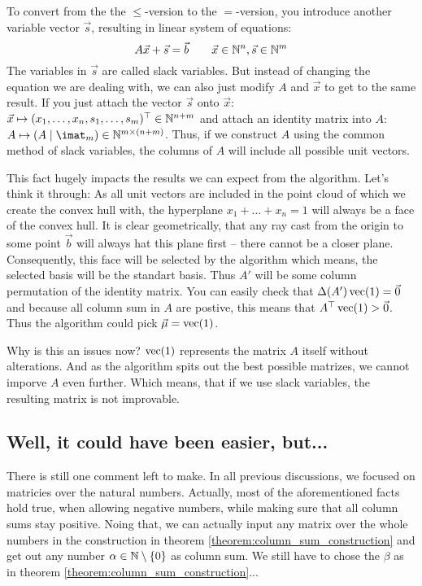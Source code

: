 To convert from the the $\leq$-version to the $=$-version, you introduce another variable vector $\vec s$, resulting in linear system of equations:
$$A\vec x + \vec s = \vec b \qquad \vec x \in \mathbb{N}^n, \vec s \in\mathbb{N}^m$$
The variables in $\vec s$ are called slack variables. But instead of changing the equation we are dealing with, we can also just modify $A$ and $\vec x$ to get to the same result. If you just attach the vector $\vec s$ onto $\vec x$: $\vec x \mapsto (x_1, \dots, x_n, s_1, \dots, s_m)^\top \in \mathbb{N}^{n+m}$ and attach an identity matrix into $A$: $A \mapsto (A \mid\imat_m) \in \N^{m \times (n + m)}$. Thus, if we construct $A$ using the common method of slack variables, the columns of $A$ will include all possible unit vectors.

This fact hugely impacts the results we can expect from the algorithm. Let's think it through: As all unit vectors are included in the point cloud of which we create the convex hull with, the hyperplane $x_1 + \dots + x_n = 1$ will always be a face of the convex hull. It is clear geometrically, that any ray cast from the origin to some point $\vec b$ will always hat this plane first – there cannot be a closer plane. Consequently, this face will be selected by the algorithm which means, the selected basis will be the standart basis.
Thus $A'$ will be some column permutation of the identity matrix. You can easily check that $\Delta(A')\operatorname{vec}(1) = \vec 0$ and because all column sum in $A$ are postive, this means that $A^\top \operatorname{vec}(1) > \vec 0$. Thus the algorithm could pick $\vec\mu = \operatorname{vec}(1)$.

Why is this an issues now? $\operatorname{vec}(1)$ represents the matrix $A$ itself without alterations. And as the algorithm spits out the best possible matrizes, we cannot imporve $A$ even further. Which means, that if we use slack variables, the resulting matrix is not improvable.

\subsection{Well, it could have been easier, but...}
There is still one comment left to make. In all previous discussions, we focused on matricies over the natural numbers. Actually, most of the aforementioned facts hold true, when allowing negative numbers, while making sure that all column sums stay positive. Noing that, we can actually input any matrix over the whole numbers in the construction in theorem \ref{theorem:column_sum_construction} and get out any number $\alpha \in \mathbb{N}\setminus\{0\}$ as column sum. We still have to chose the $\beta$ as in theorem \ref{theorem:column_sum_construction}...